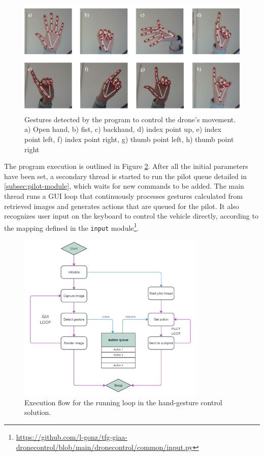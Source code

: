 \begin{figure}
  \centering
  \includegraphics[width=\textwidth, keepaspectratio]{img/hand-gestures.jpg}
  \caption{Gestures detected by the program to control the drone's movement. a) Open hand, b) fist, c) backhand, d) index point up, e) index point left, f) index point right, g) thumb point left, h) thumb point right}
  \label{fig:hand-gestures}
\end{figure}


The program execution is outlined in Figure \ref{fig:hands-loop}.
After all the initial parameters have been set, a secondary thread is started to run the pilot queue detailed in \ref{subsec:pilot-module}, which waits for new commands to be added.
The main thread runs a GUI loop that continuously processes gestures calculated from retrieved images and generates actions that are queued for the pilot.
It also recognizes user input on the keyboard to control the vehicle directly, according to the mapping defined in the \texttt{input} module\footnote{\url{https://github.com/l-gonz/tfg-giaa-dronecontrol/blob/main/dronecontrol/common/input.py}}.


\begin{figure}
  \centering
  \includegraphics[width=0.8\textwidth, keepaspectratio]{img/hand-loop.jpg}
  \caption{Execution flow for the running loop in the hand-gesture control solution.}
  \label{fig:hands-loop}
\end{figure}

